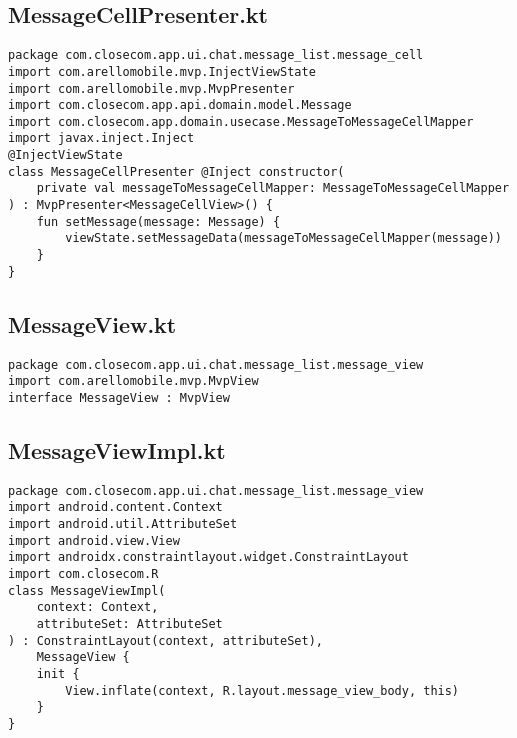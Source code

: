 \documentclass[listing]{espd}
\begin{document}
\subsection{MessageCellPresenter.kt}
\begin{verbatim}
package com.closecom.app.ui.chat.message_list.message_cell
import com.arellomobile.mvp.InjectViewState
import com.arellomobile.mvp.MvpPresenter
import com.closecom.app.api.domain.model.Message
import com.closecom.app.domain.usecase.MessageToMessageCellMapper
import javax.inject.Inject
@InjectViewState
class MessageCellPresenter @Inject constructor(
    private val messageToMessageCellMapper: MessageToMessageCellMapper
) : MvpPresenter<MessageCellView>() {
    fun setMessage(message: Message) {
        viewState.setMessageData(messageToMessageCellMapper(message))
    }
}
\end{verbatim}

\subsection{MessageView.kt}
\begin{verbatim}
package com.closecom.app.ui.chat.message_list.message_view
import com.arellomobile.mvp.MvpView
interface MessageView : MvpView
\end{verbatim}

\subsection{MessageViewImpl.kt}
\begin{verbatim}
package com.closecom.app.ui.chat.message_list.message_view
import android.content.Context
import android.util.AttributeSet
import android.view.View
import androidx.constraintlayout.widget.ConstraintLayout
import com.closecom.R
class MessageViewImpl(
    context: Context,
    attributeSet: AttributeSet
) : ConstraintLayout(context, attributeSet),
    MessageView {
    init {
        View.inflate(context, R.layout.message_view_body, this)
    }
}
\end{verbatim}
\end{document}
